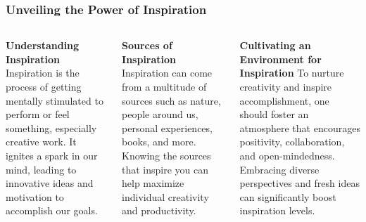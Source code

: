 \documentclass[5pt]{beamer}
\begin{document}
\begin{frame}
\frametitle{Unveiling the Power of Inspiration}
\begin{columns}
\begin{column}{0.3\textwidth}
\begin{block}{\textbf{Understanding Inspiration}}
Inspiration is the process of getting mentally stimulated to perform or feel something, especially creative work. It ignites a spark in our mind, leading to innovative ideas and motivation to accomplish our goals.
\end{block}
\end{column}
\begin{column}{0.3\textwidth}
\begin{block}{\textbf{Sources of Inspiration}}
Inspiration can come from a multitude of sources such as nature, people around us, personal experiences, books, and more. Knowing the sources that inspire you can help maximize individual creativity and productivity.
\end{block}
\end{column}
\begin{column}{0.3\textwidth}
\begin{block}{\textbf{Cultivating an Environment for Inspiration}}
To nurture creativity and inspire accomplishment, one should foster an atmosphere that encourages positivity, collaboration, and open-mindedness. Embracing diverse perspectives and fresh ideas can significantly boost inspiration levels.
\end{block}
\end{column}
\end{columns}
\end{frame}
\end{document}
